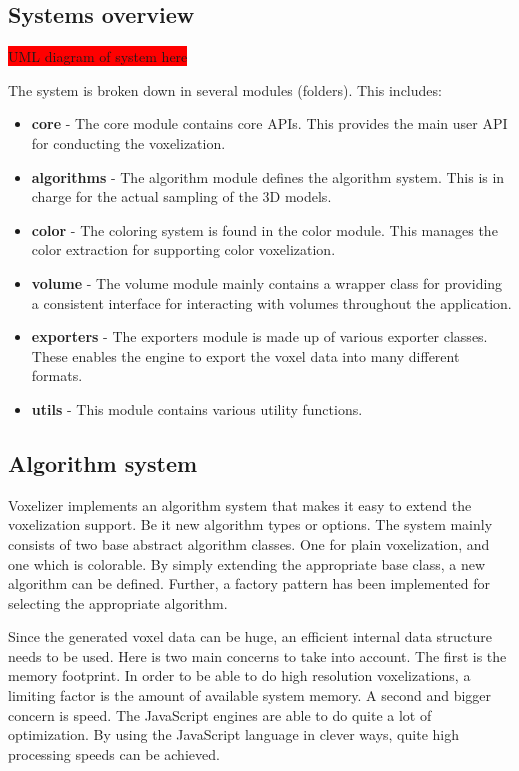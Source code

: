 \subsection{Systems overview}
\label{sec:method-implementation}
\colorbox{red}{UML diagram of system here}

The system is broken down in several modules (folders). This includes:
\begin{itemize}
    \item \textbf{core} - The core module contains core APIs. This provides the main user API for conducting the voxelization.
    \item \textbf{algorithms} - The algorithm module defines the algorithm system. This is in charge for the actual sampling of the 3D models.
    \item \textbf{color} - The coloring system is found in the color module. This manages the color extraction for supporting color voxelization.
    \item \textbf{volume} - The volume module mainly contains a wrapper class for providing a consistent interface for interacting with volumes throughout the application.  
    \item \textbf{exporters} - The exporters module is made up of various exporter classes. These enables the engine to export the voxel data into many different formats.
    \item \textbf{utils} - This module contains various utility functions.
\end{itemize}

\subsection{Algorithm system}
Voxelizer implements an algorithm system that makes it easy to extend the voxelization support. Be it new algorithm types or options. The system mainly consists of two base abstract algorithm classes. One for plain voxelization, and one which is colorable. By simply extending the appropriate base class, a new algorithm can be defined. Further, a factory pattern has been implemented for selecting the appropriate algorithm.

Since the generated voxel data can be huge, an efficient internal data structure needs to be used. Here is two main concerns to take into account. The first is the memory footprint. In order to be able to do high resolution voxelizations, a limiting factor is the amount of available system memory. A second and bigger concern is speed. The JavaScript engines are able to do quite a lot of optimization. By using the JavaScript language in clever ways, quite high processing speeds can be achieved.

